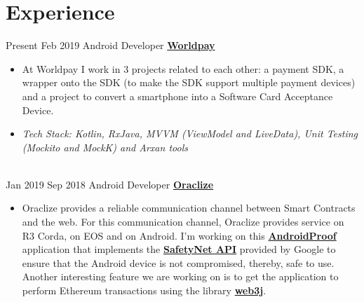 \documentclass[letterpaper]{twentysecondcv} %
\begin{document}
\makeprofile %
\section{Experience}
\begin{twenty} %

\twentyitem
    	{Present}
		{Feb 2019}
        {Android Developer}
        {\href{https://www.worldpay.com/}{\textbf{Worldpay}}}
        {}
        {\begin{itemize}
        
        	\item At Worldpay I work in 3 projects related to each other: a payment SDK, a wrapper onto the SDK (to make the SDK support multiple payment devices) and a project to convert a smartphone into a Software Card Acceptance Device.	 
        	
        	\item \textit{Tech Stack: Kotlin, RxJava, MVVM (ViewModel and LiveData), Unit Testing (Mockito and MockK) and Arxan tools}
        	
        \end{itemize}}
        \\
        
\twentyitem
    	{Jan 2019}
		{Sep 2018}
        {Android Developer}
        {\href{http://www.oraclize.it/}{\textbf{Oraclize}}}
        {}
        {\begin{itemize}
        
        	\item Oraclize provides a reliable communication channel between Smart Contracts and the web. For this communication channel, Oraclize provides service on R3 Corda, on EOS and on Android. I'm working on this \href{https://github.com/oraclize/android-proof}{\textbf{AndroidProof}} application that implements the \href{https://developer.android.com/training/safetynet/}{\textbf{SafetyNet API}} provided by Google to ensure that the Android device is not compromised, thereby, safe to use. Another interesting feature we are working on is to get the application to perform Ethereum transactions using the library \href{https://web3j.io/}{\textbf{web3j}}. 		     
        \end{itemize}}
        \\


\end{twenty}
\end{document}
